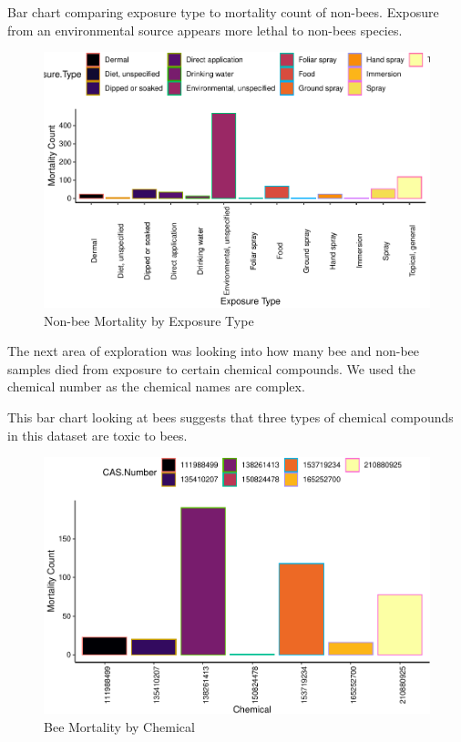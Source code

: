 \documentclass[
  12pt,
]{article}
\begin{document}
\newpage

Bar chart comparing exposure type to mortality count of non-bees.
Exposure from an environmental source appears more lethal to non-bees
species.

\begin{figure}
\centering
\includegraphics{UpdatedwithModel_files/figure-latex/non bee exposure-1.pdf}
\caption{Non-bee Mortality by Exposure Type}
\end{figure}

\newpage

The next area of exploration was looking into how many bee and non-bee
samples died from exposure to certain chemical compounds. We used the
chemical number as the chemical names are complex.

This bar chart looking at bees suggests that three types of chemical
compounds in this dataset are toxic to bees.

\begin{figure}
\centering
\includegraphics{UpdatedwithModel_files/figure-latex/bee chemical-1.pdf}
\caption{Bee Mortality by Chemical}
\end{figure}
\end{document}
